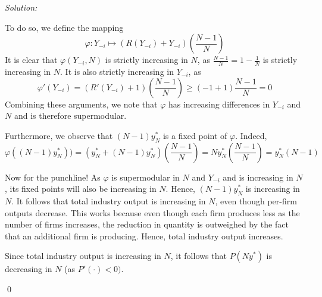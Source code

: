 \documentclass[12pt]{article}
\newenvironment{problem}[2][Problem]{\begin{trivlist}
\item[\hskip \labelsep {\bfseries #1}\hskip \labelsep {\bfseries #2.}]}{\end{trivlist}}
\newenvironment{sol}
    {\emph{Solution:}
    }
    {
    \qed
    }
\begin{document}
\begin{sol}
\begin{enumerate}[label=\alph*)]
    To do so, we define the mapping 
    \[\varphi : Y_{-i} \mapsto (R(Y_{-i}) + Y_{-i}) \left(\frac{N-1}{N}\right)\]
    It is clear that $\varphi(Y_{-i}, N)$ is strictly increasing in $N$, as $\frac{N-1}{N} = 1 - \frac{1}{N}$ is strictly increasing in $N$. It is also strictly increasing in $Y_{-i}$, as 
    \[\varphi'(Y_{-i}) = (R'(Y_{-i}) + 1)\left( \frac{N-1}{N}\right) \geq (-1 + 1) \frac{N-1}{N} = 0\]
    Combining these arguments, we note that $\varphi$ has increasing differences in $Y_{-i}$ and $N$ and is therefore supermodular. 
    
    Furthermore, we observe that $(N-1)y^*_{N}$ is a fixed point of $\varphi$. Indeed,
    \[\varphi((N-1)y^*_N)) = (y^*_N + (N-1)y^*_N)\left(\frac{N-1}{N}\right) = N y^*_N \left( \frac{N-1}{N}\right) = y^*_N (N-1)\]
    
    Now for the punchline! As $\varphi$ is supermodular in $N$ and $Y_{-i}$ and is increasing in $N$, its fixed points will also be increasing in $N$. Hence, $(N-1) y^*_N$ is increasing in $N$. It follows that total industry output is increasing in $N$, even though per-firm outputs decrease. This works because even though each firm produces less as the number of firms increases, the reduction in quantity is outweighed by the fact that an additional firm is producing. Hence, total industry output increases. 

    Since total industry output is increasing in $N$, it follows that $P(Ny^*)$ is decreasing in $N$ (as $P'(\cdot) < 0)$.
\end{enumerate}
\end{sol}
\begin{problem}{2}
\end{problem}
\end{document}
